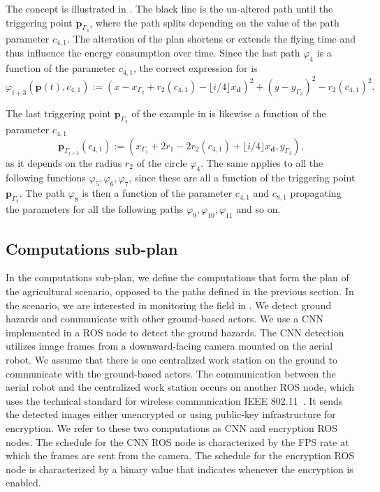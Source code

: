 The concept is illustrated in . The black line is the un-altered path until the triggering point $\mathbf{p}_{\Gamma_3}$, where the path splits depending on the value of the path parameter $c_{4,1}$. The alteration of the plan shortens or extends the flying time and thus influence the energy consumption over time. Since the last path $\varphi_4$ is a function of the parameter $c_{4,1}$, the correct expression for  is 
\begin{equation}\label{eq:line-gene-param}
  \varphi_{i+3}(\mathbf{p}(t),c_{4,1}):=(x-x_{\Gamma_2}+r_2(c_{4,1})-\lfloor i/4\rfloor x_\mathbf{d})^2+(y-y_{\Gamma_3})^2-r_2(c_{4,1})^2.
\end{equation}

The last triggering point $\mathbf{p}_{\Gamma_4}$ of the example in  is likewise a function of the parameter $c_{4,1}$
\begin{equation}
  \mathbf{p}_{\Gamma_{i+3}}(c_{4,1}):=(x_{\Gamma_1}+2r_1-2r_2(c_{4,1})+\lfloor i/4\rfloor x_\mathbf{d},y_{\Gamma_3}),
\end{equation}
as it depends on the radius $r_2$ of the circle $\varphi_4$. The same applies to all the following functions $\varphi_5,\varphi_6,\varphi_7$, since these are all a function of the triggering point $\mathbf{p}_{\Gamma_4}$. The path $\varphi_8$ is then a function of the parameter $c_{4,1}$ and $c_{8,1}$ propagating the parameters for all the following paths $\varphi_9,\varphi_{10},\varphi_{11}$ and so on.

\subsection{Computations sub-plan}
\label{sec:computation-wise}

In the computations sub-plan, we define the computations that form the plan of the agricultural scenario, opposed to the paths defined in the previous section. In the scenario, we are interested in monitoring the field in . We detect ground hazards and communicate with other ground-based actors. We use a CNN implemented in a ROS node to detect the ground hazards. The CNN detection utilizes image frames from a downward-facing camera mounted on the aerial robot. We assume that there is one centralized work station on the ground to communicate with the ground-based actors. The communication between the aerial robot and the centralized work station occurs on another ROS node, which uses the technical standard for wireless communication IEEE 802.11~\citep{crow1997ieee}. It sends the detected images either unencrypted or using public-key infrastructure for encryption. We refer to these two computations as CNN and encryption ROS nodes. The schedule for the CNN ROS node is characterized by the FPS rate at which the frames are sent from the camera. The schedule for the encryption ROS node is characterized by a binary value that indicates whenever the encryption is enabled.

